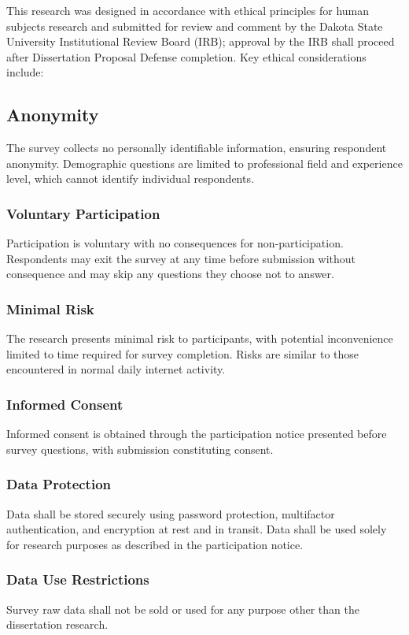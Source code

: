 This research was designed in accordance with ethical principles for human subjects research and submitted for review and comment by the Dakota State University Institutional Review Board (IRB); approval by the IRB shall proceed after Dissertation Proposal Defense completion. Key ethical considerations include:

\subsection{Anonymity} The survey collects no personally identifiable information, ensuring respondent anonymity. Demographic questions are limited to professional field and experience level, which cannot identify individual respondents.

\subsubsection{Voluntary Participation} Participation is voluntary with no consequences for non-participation. Respondents may exit the survey at any time before submission without consequence and may skip any questions they choose not to answer.

\subsubsection{Minimal Risk} The research presents minimal risk to participants, with potential inconvenience limited to time required for survey completion. Risks are similar to those encountered in normal daily internet activity.

\subsubsection{Informed Consent} Informed consent is obtained through the participation notice presented before survey questions, with submission constituting consent.

\subsubsection{Data Protection} Data shall be stored securely using password protection, multifactor authentication, and encryption at rest and in transit. Data shall be used solely for research purposes as described in the participation notice.

\subsubsection{Data Use Restrictions} Survey raw data shall not be sold or used for any purpose other than the dissertation research.


